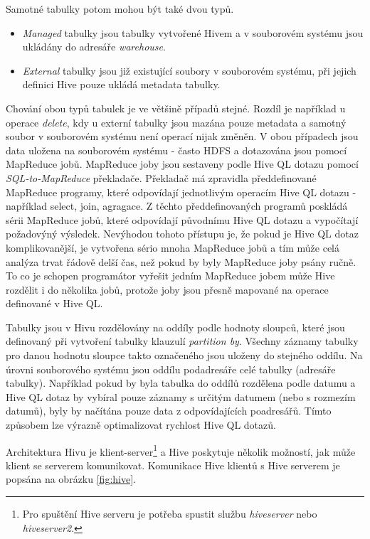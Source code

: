 \documentclass[11pt,twoside,a4paper]{book}
\begin{document}
			Samotné tabulky potom mohou být také dvou typů. 
\begin{itemize}
\item{\textit{Managed} tabulky jsou tabulky vytvořené Hivem a v souborovém systému jsou ukládány do adresáře \textit{warehouse}.}
\item{\textit{External} tabulky jsou již existující soubory v souborovém systému, při jejich definici Hive pouze ukládá metadata tabulky.}
\end{itemize}

			Chování obou typů tabulek je ve většině případů stejné. Rozdíl je například u operace \textit{delete}, kdy u externí tabulky jsou mazána pouze metadata a samotný soubor v souborovém systému není operací nijak změněn. V obou případech jsou data uložena na souborovém systému - často HDFS a dotazována jsou pomocí MapReduce jobů. MapReduce joby jsou sestaveny podle Hive QL dotazu pomocí \textit{SQL-to-MapReduce} překladače. Překladač má zpravidla předdefinované MapReduce programy, které odpovídají jednotlivým operacím Hive QL dotazu - například select, join, agragace. Z těchto předdefinovaných programů poskládá sérii MapReduce jobů, které odpovídají původnímu Hive QL dotazu a vypočítají požadovýný výsledek. Nevýhodou tohoto přístupu je, že pokud je Hive QL dotaz komplikovanější, je vytvořena sério mnoha MapReduce jobů a tím může celá analýza trvat řádově delší čas, než pokud by byly MapReduce joby psány ručně. To co je schopen programátor vyřešit jedním MapReduce jobem může Hive rozdělit i do několika jobů, protože joby jsou přesně mapované na operace definované v Hive QL.\cite{hive01}

			Tabulky jsou v Hivu rozdělovány na oddíly podle hodnoty sloupců, které jsou definovaný při vytvoření tabulky klauzulí \textit{partition by}. Všechny záznamy tabulky pro danou hodnotu sloupce takto označeného jsou uloženy do stejného oddílu. Na úrovni souborového systému jsou oddílu podadresáře celé tabulky (adresáře tabulky). Například pokud by byla tabulka do oddílů rozdělena podle datumu a Hive QL dotaz by vybíral pouze záznamy s určitým datumem (nebo s rozmezím datumů), byly by načítána pouze data z odpovídajících poadresářů. Tímto způsobem lze výrazně optimalizovat rychlost Hive QL dotazů. 

			Architektura Hivu je klient-server\footnote{Pro spuštění Hive serveru je potřeba spustit službu \textit{hiveserver} nebo \textit{hiveserver2}.} a Hive poskytuje několik možností, jak může klient se serverem komunikovat. Komunikace Hive klientů s Hive serverem je popsána na obrázku \ref{fig:hive}.
\end{document}
